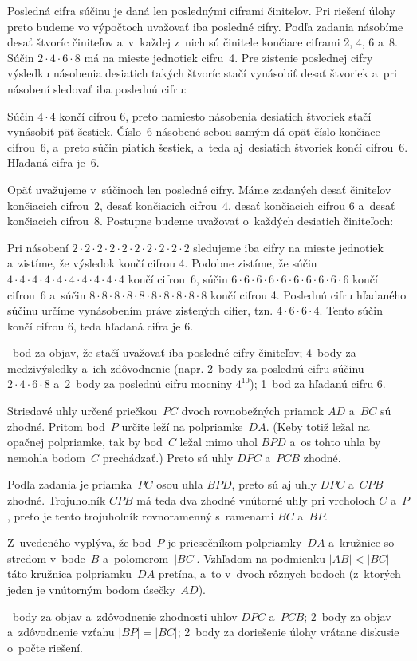 {%
Posledná cifra súčinu je daná len poslednými ciframi činiteľov.
Pri riešení úlohy preto budeme vo výpočtoch uvažovať iba posledné cifry.
Podľa zadania násobíme desať štvoríc činiteľov a~v~každej z~nich sú činitele
končiace ciframi 2, 4, 6 a~8.
Súčin $2\cdot4\cdot6\cdot8$ má na mieste jednotiek cifru~4.
Pre zistenie poslednej cifry výsledku násobenia desiatich takých štvoríc
stačí vynásobiť desať štvoriek a~pri násobení sledovať iba poslednú
cifru:

Súčin $4\cdot4$ končí cifrou 6, preto namiesto násobenia desiatich štvoriek stačí
vynásobiť päť šestiek.
Číslo~6 násobené sebou samým dá opäť číslo končiace cifrou~6, a~preto súčin
piatich šestiek, a~teda aj~desiatich štvoriek končí cifrou~6.
Hľadaná cifra je~6.

\ineriesenie
Opäť uvažujeme v~súčinoch len posledné cifry.
Máme zadaných desať činiteľov končiacich cifrou~2, desať končiacich cifrou~4,
desať končiacich cifrou 6 a~desať končiacich cifrou~8.
Postupne budeme uvažovať o~každých desiatich činiteľoch:

Pri násobení
$2\cdot2\cdot2\cdot2\cdot2\cdot2\cdot2\cdot2\cdot2\cdot2$ sledujeme iba
cifry na mieste jednotiek a~zistíme, že výsledok končí cifrou 4.
Podobne zistíme, že
súčin $4\cdot4\cdot4\cdot4\cdot4\cdot4\cdot4\cdot4\cdot4\cdot4$ končí
cifrou~6, súčin $6\cdot6\cdot6\cdot6\cdot6\cdot6\cdot6\cdot6\cdot6\cdot6$
končí cifrou~6 a~súčin
$8\cdot8\cdot8\cdot8\cdot8\cdot8\cdot8\cdot8\cdot8\cdot8$ končí cifrou 4.
Poslednú cifru hľadaného súčinu určíme vynásobením práve zistených
cifier, tzn. $4\cdot6\cdot6\cdot4$.
Tento súčin končí cifrou 6, teda hľadaná cifra je 6.

~bod za objav, že stačí uvažovať iba posledné cifry činiteľov;
4~body za medzivýsledky a~ich zdôvodnenie
(napr. 2~body za poslednú cifru súčinu $2\cdot4\cdot6\cdot8$ a~2~body za
poslednú cifru mocniny $4^{10}$);
1~bod za hľadanú cifru 6.
\endhodnotenie
}

{%
Striedavé uhly určené priečkou~$PC$ dvoch rovnobežných priamok $AD$ a~$BC$ sú
zhodné.
Pritom bod~$P$ určite leží na polpriamke~$DA$.
(Keby totiž ležal na opačnej polpriamke, tak by bod~$C$ ležal mimo uhol
$BPD$ a~os tohto uhla by nemohla bodom~$C$ prechádzať.)
Preto sú uhly $DPC$ a~$PCB$ zhodné.

Podľa zadania je priamka~$PC$ osou uhla $BPD$, preto sú aj uhly $DPC$
a~$CPB$ zhodné.
Trojuholník $CPB$ má teda dva zhodné vnútorné uhly pri vrcholoch $C$ a~$P$,
preto je tento trojuholník rovnoramenný s~ramenami $BC$ a~$BP$.

Z~uvedeného vyplýva, že bod~$P$ je priesečníkom polpriamky~$DA$ a~kružnice so
stredom v~bode~$B$ a~polomerom~$|BC|$.
Vzhľadom na podmienku $|AB|<|BC|$ táto kružnica polpriamku~$DA$ pretína, a~to
v~dvoch rôznych bodoch (z~ktorých jeden je vnútorným bodom úsečky~$AD$).
%

~body za objav a~zdôvodnenie zhodnosti uhlov $DPC$ a~$PCB$;
2~body za objav a~zdôvodnenie vzťahu $|BP|=|BC|$;
2~body za doriešenie úlohy vrátane diskusie o~počte riešení.
\endhodnotenie
}

